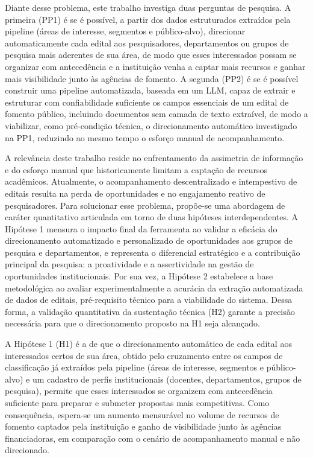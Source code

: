 \documentclass[12pt]{article}
\begin{document}
  Diante desse problema, este trabalho investiga duas perguntas de pesquisa. A primeira (PP1) é se é possível, a partir dos dados estruturados extraídos pela pipeline (áreas de interesse, segmentos e público-alvo), direcionar automaticamente cada edital aos pesquisadores, departamentos ou grupos de pesquisa mais aderentes de sua área, de modo que esses interessados possam se organizar com antecedência e a instituição venha a captar mais recursos e ganhar mais visibilidade junto às agências de fomento. A segunda (PP2) é se é possível construir uma pipeline automatizada, baseada em um LLM, capaz de extrair e estruturar com confiabilidade suficiente os campos essenciais de um edital de fomento público, incluindo documentos sem camada de texto extraível, de modo a viabilizar, como pré-condição técnica, o direcionamento automático investigado na PP1, reduzindo ao mesmo tempo o esforço manual de acompanhamento.

  A relevância deste trabalho reside no enfrentamento da assimetria de informação e do esforço manual que historicamente limitam a captação de recursos acadêmicos. Atualmente, o acompanhamento descentralizado e intempestivo de editais resulta na perda de oportunidades e no engajamento reativo de pesquisadores. Para solucionar esse problema, propõe-se uma abordagem de caráter quantitativo articulada em torno de duas hipóteses interdependentes. A Hipótese 1 mensura o impacto final da ferramenta ao validar a eficácia do direcionamento automatizado e personalizado de oportunidades aos grupos de pesquisa e departamentos, e representa o diferencial estratégico e a contribuição principal da pesquisa: a proatividade e a assertividade na gestão de oportunidades institucionais. Por sua vez, a Hipótese 2 estabelece a base metodológica ao avaliar experimentalmente a acurácia da extração automatizada de dados de editais, pré-requisito técnico para a viabilidade do sistema. Dessa forma, a validação quantitativa da sustentação técnica (H2) garante a precisão necessária para que o direcionamento proposto na H1 seja alcançado.

  A Hipótese 1 (H1) é a de que o direcionamento automático de cada edital aos interessados certos de sua área, obtido pelo cruzamento entre os campos de classificação já extraídos pela pipeline (áreas de interesse, segmentos e público-alvo) e um cadastro de perfis institucionais (docentes, departamentos, grupos de pesquisa), permite que esses interessados se organizem com antecedência suficiente para preparar e submeter propostas mais competitivas. Como consequência, espera-se um aumento mensurável no volume de recursos de fomento captados pela instituição e ganho de visibilidade junto às agências financiadoras, em comparação com o cenário de acompanhamento manual e não direcionado.
\end{document}
